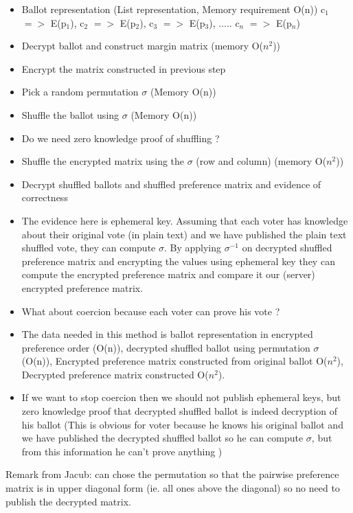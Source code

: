 \documentclass{llncs}
\begin{document}
\begin{itemize}
\item Ballot representation (List representation, Memory requirement O(n))
c$_{1}$ $=>$ E(p$_{1}$),  c$_{2}$ $=>$ E(p$_{2}$), c$_{3}$ $=>$ E(p$_{3}$), ..... c$_{n}$ $=>$ E(p$_{n}$)
\item Decrypt ballot and construct margin matrix (memory O($n^2$))
\item Encrypt the matrix constructed in previous step 
\item Pick a random permutation  $\sigma$  (Memory O(n))
\item Shuffle the ballot using $\sigma$ (Memory O(n))
\item Do we need zero knowledge proof of shuffling ?
\item Shuffle the encrypted matrix using the $\sigma$ (row and column) (memory O($n^2$))
\item Decrypt shuffled ballots and shuffled preference matrix and evidence of 
correctness
\item The evidence here is ephemeral key. Assuming that each voter has
knowledge about their original vote (in plain text) and we have published the 
plain text shuffled vote, they can compute $\sigma$. By applying $\sigma^{-1}$ on 
decrypted shuffled preference matrix and encrypting the values using ephemeral key
they can compute the encrypted preference matrix and compare it our (server) 
encrypted preference matrix. 
\item What about coercion because each voter can prove his vote ?  
\item The data needed in this method is ballot representation in encrypted preference order (O(n)), decrypted shuffled ballot 
using permutation $\sigma$ (O(n)), Encrypted preference matrix constructed from original ballot O($n^2$), Decrypted preference matrix constructed O($n^2$). 
\item If we want to stop coercion then we should not publish ephemeral keys, but
zero knowledge proof that decrypted shuffled ballot is indeed decryption of his 
ballot (This is obvious for voter because he knows his original ballot and 
we have published the decrypted shuffled ballot so he can compute $\sigma$, but 
from this information he can't prove anything )
	 


\end{itemize}

Remark from Jacub: can chose the permutation so that the pairwise
preference matrix is in upper diagonal form (ie. all ones above the
diagonal) so no need to publish the decrypted matrix. 
\end{document}
